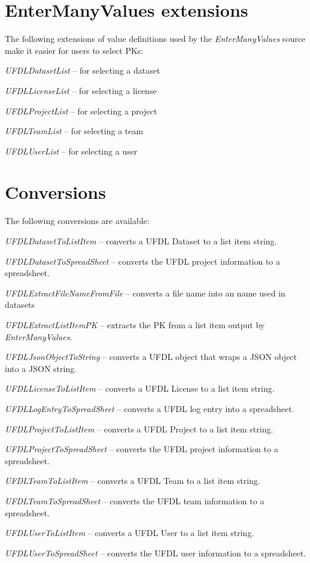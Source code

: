 \documentclass[a4paper]{book}
\begin{document}
\section{EnterManyValues extensions}
The following extensions of value definitions used by the \textit{EnterManyValues}
source make it easier for users to select PKs:
\begin{tight_itemize}
  \item \textit{UFDLDatasetList} -- for selecting a dataset
  \item \textit{UFDLLicenseList} -- for selecting a license
  \item \textit{UFDLProjectList} -- for selecting a project
  \item \textit{UFDLTeamList} -- for selecting a team
  \item \textit{UFDLUserList} -- for selecting a user
\end{tight_itemize}

\section{Conversions}
The following conversions are available:
\begin{tight_itemize}
  \item \textit{UFDLDatasetToListItem} -- converts a UFDL Dataset to a list item string.
  \item \textit{UFDLDatasetToSpreadSheet} -- converts the UFDL project information to a spreadsheet.
  \item \textit{UFDLExtractFileNameFromFile} -- converts a file name into an name used in datasets
  \item \textit{UFDLExtractListItemPK} -- extracts the PK from a list item output by \textit{EnterManyValues}.
  \item \textit{UFDLJsonObjectToString} -- converts a UFDL object that wraps a JSON object into a JSON string.
  \item \textit{UFDLLicenseToListItem} -- converts a UFDL License to a list item string.
  \item \textit{UFDLLogEntryToSpreadSheet} -- converts a UFDL log entry into a spreadsheet.
  \item \textit{UFDLProjectToListItem} -- converts a UFDL Project to a list item string.
  \item \textit{UFDLProjectToSpreadSheet} -- converts the UFDL project information to a spreadsheet.
  \item \textit{UFDLTeamToListItem} -- converts a UFDL Team to a list item string.
  \item \textit{UFDLTeamToSpreadSheet} -- converts the UFDL team information to a spreadsheet.
  \item \textit{UFDLUserToListItem} -- converts a UFDL User to a list item string.
  \item \textit{UFDLUserToSpreadSheet} -- converts the UFDL user information to a spreadsheet.
\end{tight_itemize}



\end{document}
